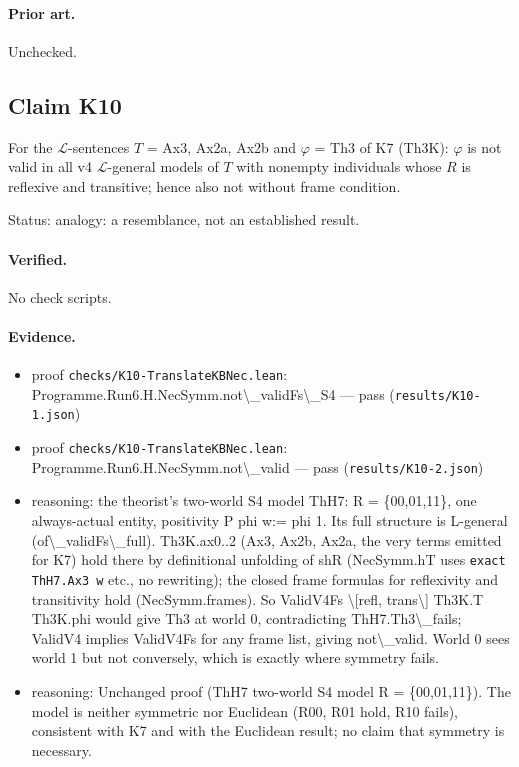 \documentclass{article}
\begin{document}
\paragraph{Prior art.} Unchecked.

\subsection*{Claim K10}

For the $\mathcal L$-sentences $T$ = Ax3, Ax2a, Ax2b and $\varphi$ = Th3 of K7 (Th3K): $\varphi$ is not valid in all v4 $\mathcal L$-general models of $T$ with nonempty individuals whose $R$ is reflexive and transitive; hence also not without frame condition.

Status: analogy: a resemblance, not an established result.

\paragraph{Verified.}
No check scripts.

\paragraph{Evidence.}
\begin{itemize}
\item proof \texttt{checks/K10-TranslateKBNec.lean}: Programme.Run6.H.NecSymm.not\textbackslash{}\_validFs\textbackslash{}\_S4 --- pass (\texttt{results/K10-1.json})
\item proof \texttt{checks/K10-TranslateKBNec.lean}: Programme.Run6.H.NecSymm.not\textbackslash{}\_valid --- pass (\texttt{results/K10-2.json})
\item reasoning: the theorist's two-world S4 model ThH7: R = \{00,01,11\}, one always-actual entity, positivity P phi w:= phi 1. Its full structure is L-general (of\textbackslash{}\_validFs\textbackslash{}\_full). Th3K.ax0..2 (Ax3, Ax2b, Ax2a, the very terms emitted for K7) hold there by definitional unfolding of shR (NecSymm.hT uses \texttt{exact ThH7.Ax3 w} etc., no rewriting); the closed frame formulas for reflexivity and transitivity hold (NecSymm.frames). So ValidV4Fs \textbackslash{}[refl, trans\textbackslash{}] Th3K.T Th3K.phi would give Th3 at world 0, contradicting ThH7.Th3\textbackslash{}\_fails; ValidV4 implies ValidV4Fs for any frame list, giving not\textbackslash{}\_valid. World 0 sees world 1 but not conversely, which is exactly where symmetry fails.
\item reasoning: Unchanged proof (ThH7 two-world S4 model R = \{00,01,11\}). The model is neither symmetric nor Euclidean (R00, R01 hold, R10 fails), consistent with K7 and with the Euclidean result; no claim that symmetry is necessary.
\end{itemize}
\end{document}
